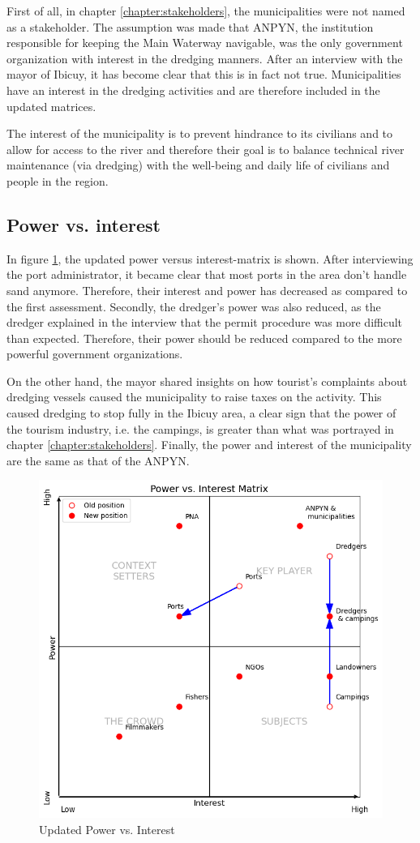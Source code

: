 First of all, in chapter \ref{chapter:stakeholders}, the municipalities were not named as a stakeholder. The assumption was made that ANPYN, the institution responsible for keeping the Main Waterway navigable, was the only government organization with interest in the dredging manners. After an interview with the mayor of Ibicuy, it has become clear that this is in fact not true. Municipalities have an interest in the dredging activities and are therefore included in the updated matrices.

The interest of the municipality is to prevent hindrance to its civilians and to allow for access to the river and therefore their goal is to balance technical river maintenance (via dredging) with the well-being and daily life of civilians and people in the region.

\subsection{Power vs. interest}
In figure \ref{fig:power-interestNEW}, the updated power versus interest-matrix is shown. After interviewing the port administrator, it became clear that most ports in the area don't handle sand anymore. Therefore, their interest and power has decreased as compared to the first assessment. Secondly, the dredger's power was also reduced, as the dredger explained in the interview that the permit procedure was more difficult than expected. Therefore, their power should be reduced compared to the more powerful government organizations.

On the other hand, the mayor shared insights on how tourist's complaints about dredging vessels caused the municipality to raise taxes on the activity. This caused dredging to stop fully in the Ibicuy area, a clear sign that the power of the tourism industry, i.e. the campings, is greater than what was portrayed in chapter \ref{chapter:stakeholders}. Finally, the power and interest of the municipality are the same as that of the ANPYN.

\begin{figure}[H]
    \centering
    \includegraphics[width=0.70\linewidth]{figures/ch3/NewPowerVSInterest.png}
    \caption{Updated Power vs. Interest}
    \label{fig:power-interestNEW}
\end{figure}

